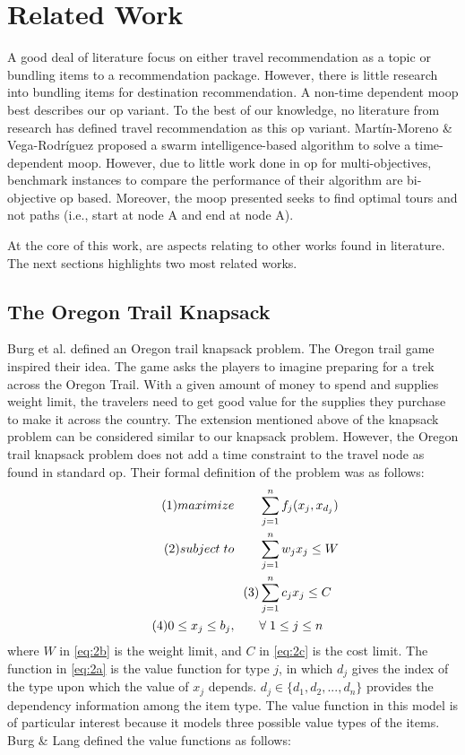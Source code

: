 \section{Related Work}
A good deal of literature focus on either travel recommendation as a topic or bundling items to a recommendation package. However, there is little research into bundling items for destination recommendation. A non-time dependent \gls{moop} best describes our \gls{op} variant. To the best of our knowledge, no literature from research has defined travel recommendation as this \gls{op} variant. Martín-Moreno \& Vega-Rodríguez \parencite{Martin-Moreno2018Multi-ObjectiveProblem} proposed a swarm intelligence-based algorithm to solve a time-dependent \gls{moop}. However, due to little work done in \gls{op} for multi-objectives, benchmark instances to compare the performance of their algorithm are bi-objective \gls{op} based. Moreover, the \gls{moop} presented seeks to find optimal tours and not paths (i.e., start at node A and end at node A).

At the core of this work, are aspects relating to other works found in literature. The next sections highlights two most related works.


\subsection{The Oregon Trail Knapsack} \label{sec:oregon}
Burg et al. \parencite{Oregon_Trail_Knapsack} defined an Oregon trail knapsack problem. The Oregon trail game inspired their idea. The game asks the players to imagine preparing for a trek across the Oregon Trail. With a given amount of money to spend and supplies weight limit, the travelers need to get good value for the supplies they purchase to make it across the country. The extension mentioned above of the knapsack problem can be considered similar to our knapsack problem. However, the Oregon trail knapsack problem does not add a time constraint to the travel node as found in standard \gls{op}. Their formal definition of the problem was as follows:
\begin{align}\tag{1}
    maximize \qquad &\sum_{j=1}^n f_j(x_j, x_{d_j})\label{eq:2a}\\
    \tag{2}subject \hspace{0.1cm} to \qquad &\sum_{j=1}^n w_j x_j \leq W\label{eq:2b} \\
  \tag{3} &\sum_{j=1}^n c_j x_j \leq C\label{eq:2c} \\
   \tag{4}  0\leq x_j \leq b_j, \qquad &\forall \hspace{0.1cm} 1 \leq j \leq n\label{eq:2d}
\end{align}
where $W$ in \ref{eq:2b} is the weight limit, and $C$ in \ref{eq:2c} is the cost limit. The function in \ref{eq:2a} is the value function for type $j$, in which $d_j$ gives the index of the type upon which the value of $x_j$ depends.  $d_j \in \{d_1, d_2,...,d_n\}$ provides the dependency information among the item type. The value function in this model is of particular interest because it models three possible value types of the items. Burg \& Lang\parencite{Oregon_Trail_Knapsack} defined the value functions as follows:

